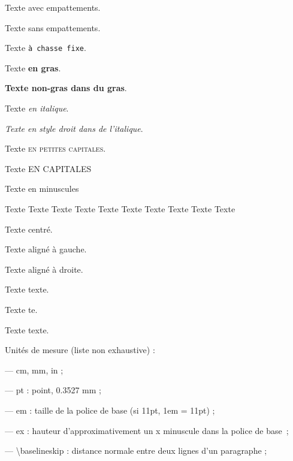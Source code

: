 \documentclass{article}
\begin{document}
Texte \textrm{avec empattements}.

Texte \textsf{sans empattements}.

Texte \texttt{à chasse fixe}.\newline

Texte \textbf{en gras}.

\textbf{Texte \textmd{non-gras} dans du gras}.\newline

Texte \textit{en italique}.

\textit{Texte en \textup{style droit} dans de l'italique}.\newline

Texte \textsc{en petites capitales}.

Texte \uppercase{en capitales}

Texte \lowercase{EN MINUSCULES}\newline

{\tiny Texte
\scriptsize Texte
\footnotesize Texte
\small Texte
\normalsize Texte
\large Texte
\Large Texte
\LARGE Texte
\huge Texte
\Huge Texte}

\begin{center}
Texte centré.
\end{center}

\begin{flushleft}
Texte aligné à gauche.
\end{flushleft}

\begin{flushright}
Texte aligné à droite.\newline
\end{flushright}

Texte texte.

Texte \phantom{tex}te.\medskip%

Texte \hspace{2em} texte.\newline

Unités de mesure (liste non exhaustive) :

— cm, mm, in ;

— pt : point, 0.3527 mm ;

— em : taille de la police de base (si 11pt, 1em = 11pt) ;

— ex : hauteur d’approximativement un x minuscule dans la police de \mbox{base ;}

— \textbackslash baselineskip : distance normale entre deux lignes d’un paragraphe ;
\end{document}
